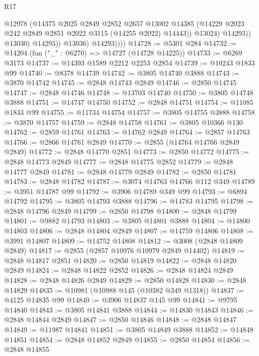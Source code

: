\begin{lexlean}{R17}
\begin{coremodule}
                          @12978
                          (@14375
                            @2025
                            @2849
                            @2852
                            @2657
                            @13002
                            @14385
                            (@14229 @2023 @242 @2849 @2851 @2022 @3115 (@14255 @2022) @14443))
                          @13024)
                        @14293))
                    @13030)
                  @14293))
              @13036)
            @14293))))
@14728 := @5301 @284
@14732 := @14204 (fun ("_" : @6270) => @14727 (@14728 @14225))
@14733 := @6269 @3173
@14737 := @14393 @1589 @2212 @2253 @2854
@14739 := @10243 @1833 @99
@14740 := @8378 @14739
@14742 := @3805 @14740 @3888
@14743 := @3870 @14742
@14745 := @2848 @14743 @2849
@14746 := @2850 @14745
@14747 := @2848 @14746
@14748 := @13703 @14740
@14750 := @3805 @14748 @3888
@14751 := @14747 @14750
@14752 := @2848 @14751
@14754 := @11085 @1833 @99
@14755 := @11734 @14754
@14757 := @3805 @14755 @3888
@14758 := @3870 @14757
@14759 := @2848 @14758
@14761 := @3805 @10366 @130
@14762 := @2859 @14761
@14763 := @14762 @2849
@14764 := @2857 @14763
@14766 := @2866 @14761 @2849
@14770 := @2855 (@14764 @14766 @2849 @2849)
@14772 := @2848 @14770 @2851
@14773 := @2850 @14772
@14775 := @2848 @14773 @2849
@14777 := @2848 @14775 @2852
@14779 := @2848 @14777 @2849
@14781 := @2848 @14779 @2849
@14782 := @2850 @14781
@14783 := @2848 @14782
@14787 := @3074 @14763 @14766 @112 @349
@14789 := @3951 @14787 @99
@14792 := @3906 @14789 @349 @99
@14793 := @6894 @14792
@14795 := @3805 @14793 @3888
@14796 := @14783 @14795
@14798 := @2848 @14796 @2849
@14799 := @2850 @14798
@14800 := @2848 @14799
@14801 := @9882 @14793
@14803 := @3805 @14801 @3888
@14804 := @14800 @14803
@14806 := @2848 @14804 @2849
@14807 := @14759 @14806
@14808 := @3991 @14807
@14809 := @14752 @14808
@14812 := @3008 (@2848 @14809 @2849)
@14817 := @2855 (@2857 @10976 @10979 @2849 @14402)
@14819 := @2848 @14817 @2851
@14820 := @2850 @14819
@14822 := @2848 @14820 @2849
@14824 := @2848 @14822 @2852
@14826 := @2848 @14824 @2849
@14828 := @2848 @14826 @2849
@14829 := @2850 @14828
@14830 := @2848 @14829
@14835 := @10981 (@10988 @145 (@10382 @349 @1318))
@14837 := @4125 @14835 @99
@14840 := @3906 @14837 @145 @99
@14841 := @9795 @14840
@14843 := @3805 @14841 @3888
@14844 := @14830 @14843
@14846 := @2848 @14844 @2849
@14847 := @2850 @14846
@14848 := @2848 @14847
@14849 := @11987 @14841
@14851 := @3805 @14849 @3888
@14852 := @14848 @14851
@14854 := @2848 @14852 @2849
@14855 := @2850 @14854
@14856 := @2848 @14855

\end{coremodule}
\end{lexlean}
